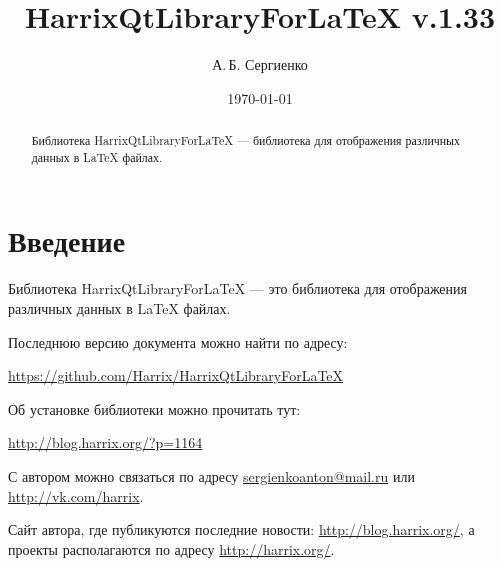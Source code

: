 \documentclass[a4paper,12pt]{article}
\title{HarrixQtLibraryForLaTeX v.1.33}
\author{А.\,Б. Сергиенко}
\date{\today}
\begin{document}


\maketitle

\begin{abstract}
Библиотека HarrixQtLibraryForLaTeX --- библиотека для отображения различных данных в LaTeX файлах.
\end{abstract}

\tableofcontents

\newpage

\section{Введение}

Библиотека HarrixQtLibraryForLaTeX --- это библиотека для отображения различных данных в LaTeX файлах.

Последнюю версию документа можно найти по адресу:

\href{https://github.com/Harrix/HarrixQtLibraryForLaTeX}{https://github.com/Harrix/HarrixQtLibraryForLaTeX}

Об установке библиотеки можно прочитать тут:

\href{http://blog.harrix.org/?p=1164}{http://blog.harrix.org/?p=1164}

С автором можно связаться по адресу \href{mailto:sergienkoanton@mail.ru}{sergienkoanton@mail.ru} или  \href{http://vk.com/harrix}{http://vk.com/harrix}.

Сайт автора, где публикуются последние новости: \href{http://blog.harrix.org/}{http://blog.harrix.org/}, а проекты располагаются по адресу \href{http://harrix.org/}{http://harrix.org/}.

\newpage
\end{document}
